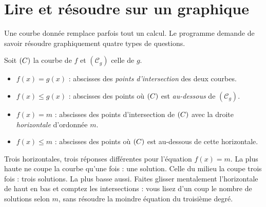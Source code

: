 \section{Lire et résoudre sur un graphique}

Une courbe donnée remplace parfois tout un calcul. Le programme demande de
savoir résoudre graphiquement quatre types de questions.

\begin{propriete}
Soit $(C)$ la courbe de $f$ et $(\mathscr{C}_{g})$ celle de $g$.
\begin{itemize}[leftmargin=1.4em, itemsep=0.22em]
  \item $f(x) = g(x)$ : abscisses des \emph{points d'intersection} des deux
        courbes.
  \item $f(x) \leq g(x)$ : abscisses des points où $(C)$ est \emph{au-dessous}
        de $(\mathscr{C}_{g})$.
  \item $f(x) = m$ : abscisses des points d'intersection de $(C)$ avec la
        droite \emph{horizontale} d'ordonnée $m$.
  \item $f(x) \leq m$ : abscisses des points où $(C)$ est au-dessous de cette
        horizontale.
\end{itemize}
\end{propriete}

\begin{visualisation}
\begin{center}
\end{center}

Trois horizontales, trois réponses différentes pour l'équation $f(x) = m$.
La plus haute ne coupe la courbe qu'une fois : une solution. Celle du milieu
la coupe trois fois : trois solutions. La plus basse aussi. Faites glisser
mentalement l'horizontale de haut en bas et comptez les intersections : vous
lisez d'un coup le nombre de solutions selon $m$, sans résoudre la moindre
équation du troisième degré.
\end{visualisation}

